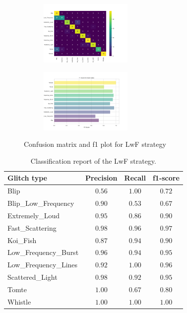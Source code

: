 \begin{figure}[ht]
\centering
\begin{subfigure}
  \centering
  \includegraphics[width=0.49\textwidth]{Images/cm_LwF_MultiView_100epochs.png}  
  \label{fig:sub-first2}
\end{subfigure}
\begin{subfigure}
  \centering
  \includegraphics[width=0.49\textwidth]{Images/f1_LwF_MultiView_100epochs.png}  
  \label{fig:sub-second2}
\end{subfigure}
\caption{Confusion matrix and f1 plot for LwF strategy}
\label{fig:cm_f1_lwf_baseline}
\end{figure}

\begin{table}
\centering
    \begin{tabular}{|l|c c c|}
    \hline
    \textbf{Glitch type} & \textbf{Precision} & \textbf{Recall} & \textbf{f1-score} \\ \hline
    Blip & $0.56$ & $1.00$ & $0.72$ \\
    Blip\_Low\_Frequency & $0.90$ & $0.53$ & $0.67$\\
    Extremely\_Loud & $0.95$ & $0.86$ &  $0.90$\\
    Fast\_Scattering & $0.98$ & $0.96$ &  $0.97$\\
    Koi\_Fish & $0.87$ & $0.94$ & $0.90$\\
    Low\_Frequency\_Burst & $0.96$ & $0.94$ & $0.95$\\
    Low\_Frequency\_Lines & $0.92$ & $1.00$ & $0.96$\\
    Scattered\_Light & $0.98$ & $0.92$ &$0.95$ \\
    Tomte & $1.00$ & $0.67$ &$0.80$ \\
    Whistle & $1.00$ & $1.00$ & $1.00$ \\
    \hline
    \end{tabular}
    \caption{Classification report of the LwF strategy.}
    \label{tbl:RQ1_class_report_LWF}
\end{table}


